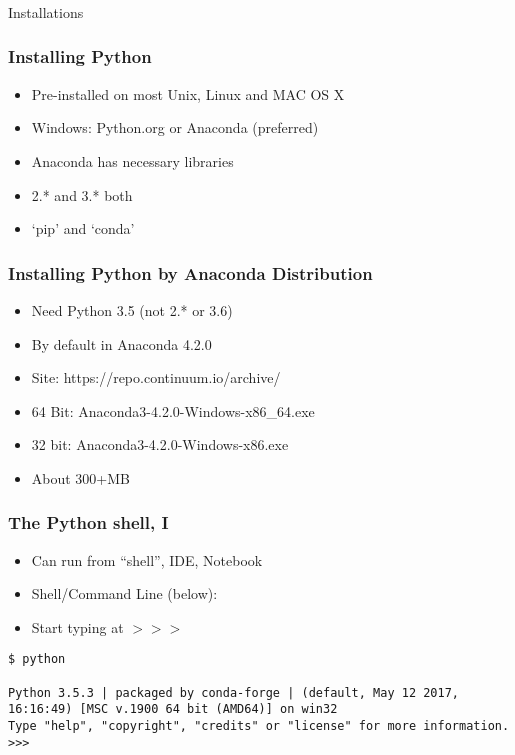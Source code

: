 \begin{frame}[fragile]\frametitle{}
\begin{center}
{\Large Installations}
\end{center}
\end{frame}

\begin{frame}[fragile]\frametitle{Installing Python}
  \begin{itemize}
  \item Pre-installed on most Unix, Linux and MAC OS X
   \item Windows: Python.org or Anaconda (preferred)
   \item Anaconda has necessary libraries
\item 2.* and 3.* both
\item `pip' and `conda'
  \end{itemize}
\end{frame}

\begin{frame}[fragile]\frametitle{Installing Python by Anaconda Distribution}
  \begin{itemize}
  \item Need Python 3.5 (not 2.* or 3.6)
  \item By default in Anaconda 4.2.0
  \item Site: https://repo.continuum.io/archive/
  \item 64 Bit: Anaconda3-4.2.0-Windows-x86\_64.exe
  \item 32 bit: Anaconda3-4.2.0-Windows-x86.exe
  \item About 300+MB
  \end{itemize}
\end{frame}

\begin{frame}[fragile]  \frametitle{The Python shell, I}
  \begin{itemize}
 \item Can run from ``shell'', IDE, Notebook
 \item Shell/Command Line (below):

\item Start typing at  $>>>$ 
\end{itemize}

\begin{lstlisting}
$ python

Python 3.5.3 | packaged by conda-forge | (default, May 12 2017, 16:16:49) [MSC v.1900 64 bit (AMD64)] on win32
Type "help", "copyright", "credits" or "license" for more information.
>>>
\end{lstlisting}
\end{frame}

